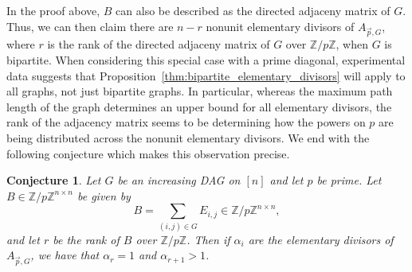 \documentclass[12pt]{amsart}
\newtheorem{conj}[thm]{Conjecture}
\theoremstyle{definition}
\numberwithin{equation}{section}
\newcommand{\ring}[1]{\ensuremath{\mathbb{#1}}}
\renewcommand\>{\rangle}
\newcommand\<{\langle}
\newcommand\0{\mathbf{0}}
\newcommand\ZZ{\ring{Z}}
\begin{document}
In the proof above, $B$ can also be described as the directed adjaceny matrix of $G$. Thus, we can then claim there are $n-r$ nonunit elementary divisors of $A_{\vec{p}, G}$, where $r$ is the rank of the directed adjaceny matrix of $G$ over $\ZZ/p\ZZ$, when $G$ is bipartite. 
When considering this special case with a prime diagonal, experimental data suggests that Proposition~\ref{thm:bipartite_elementary_divisors} will apply to all graphs, not just bipartite graphs. 
In particular, whereas the maximum path length of the graph determines an upper bound for all elementary divisors, the rank of the adjacency matrix seems to be determining how the powers on $p$ are being distributed across the nonunit elementary divisors.
We end with the following conjecture which makes this observation precise.

\begin{conj}
	Let $G$ be an increasing DAG on $[n]$ and let $p$ be prime. Let $B \in \ZZ/p\ZZ^{n \times n}$ be given by
	\[B = \sum_{(i,j) \in G} E_{i,j} \in \ZZ/p\ZZ^{n\times n},\]
	and let $r$ be the rank of $B$ over $\ZZ/p\ZZ$. Then if $\alpha_i$ are the elementary divisors of $A_{\vec{p}, G}$, we have that $\alpha_{r} = 1$ and $\alpha_{r+1} > 1$.
\end{conj}



\end{document}

